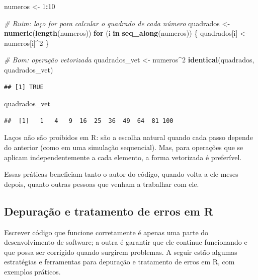 \documentclass[
]{book}
\newenvironment{Shaded}{\begin{snugshade}}{\end{snugshade}}
\newcommand{\CommentTok}[1]{\textcolor[rgb]{0.56,0.35,0.01}{\textit{#1}}}
\newcommand{\ControlFlowTok}[1]{\textcolor[rgb]{0.13,0.29,0.53}{\textbf{#1}}}
\newcommand{\DecValTok}[1]{\textcolor[rgb]{0.00,0.00,0.81}{#1}}
\newcommand{\FunctionTok}[1]{\textcolor[rgb]{0.13,0.29,0.53}{\textbf{#1}}}
\newcommand{\NormalTok}[1]{#1}
\newcommand{\OtherTok}[1]{\textcolor[rgb]{0.56,0.35,0.01}{#1}}
\newcommand{\SpecialCharTok}[1]{\textcolor[rgb]{0.81,0.36,0.00}{\textbf{#1}}}
\begin{document}
\begin{Shaded}
\begin{Highlighting}[]
\NormalTok{numeros }\OtherTok{\textless{}{-}} \DecValTok{1}\SpecialCharTok{:}\DecValTok{10}

\CommentTok{\# Ruim: laço for para calcular o quadrado de cada número}
\NormalTok{quadrados }\OtherTok{\textless{}{-}} \FunctionTok{numeric}\NormalTok{(}\FunctionTok{length}\NormalTok{(numeros))}
\ControlFlowTok{for}\NormalTok{ (i }\ControlFlowTok{in} \FunctionTok{seq\_along}\NormalTok{(numeros)) \{}
\NormalTok{  quadrados[i] }\OtherTok{\textless{}{-}}\NormalTok{ numeros[i]}\SpecialCharTok{\^{}}\DecValTok{2}
\NormalTok{\}}

\CommentTok{\# Bom: operação vetorizada}
\NormalTok{quadrados\_vet }\OtherTok{\textless{}{-}}\NormalTok{ numeros}\SpecialCharTok{\^{}}\DecValTok{2}
\FunctionTok{identical}\NormalTok{(quadrados, quadrados\_vet)}
\end{Highlighting}
\end{Shaded}

\begin{verbatim}
## [1] TRUE
\end{verbatim}

\begin{Shaded}
\begin{Highlighting}[]
\NormalTok{quadrados\_vet}
\end{Highlighting}
\end{Shaded}

\begin{verbatim}
##  [1]   1   4   9  16  25  36  49  64  81 100
\end{verbatim}

Laços não são proibidos em R: são a escolha natural quando cada passo depende do anterior (como em uma simulação sequencial). Mas, para operações que se aplicam independentemente a cada elemento, a forma vetorizada é preferível.

Essas práticas beneficiam tanto o autor do código, quando volta a ele meses depois, quanto outras pessoas que venham a trabalhar com ele.

\subsection{Depuração e tratamento de erros em R}\label{depurauxe7uxe3o-e-tratamento-de-erros-em-r}

Escrever código que funcione corretamente é apenas uma parte do desenvolvimento de software; a outra é garantir que ele continue funcionando e que possa ser corrigido quando surgirem problemas. A seguir estão algumas estratégias e ferramentas para depuração e tratamento de erros em R, com exemplos práticos.
\end{document}
